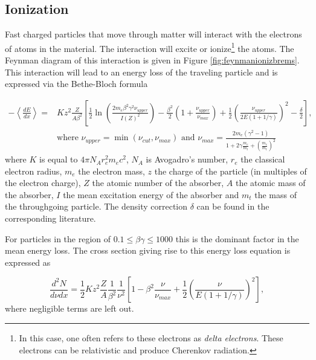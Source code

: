 \subsection{Ionization}
Fast charged particles that move through matter will interact with the electrons of atoms in the material. The interaction will excite or ionize\footnote{In this case, one often refers to these electrons as \textit{delta electrons}. These electrons can be relativistic and produce Cherenkov radiation.} the atoms. The Feynman diagram of this interaction is given in Figure \ref{fig:feynmanionizbrems}. This interaction will lead to an energy loss of the traveling particle and is expressed via the Bethe-Bloch formula

\begin{equation}
\label{eq:ioniz}
\begin{split}
-\left\langle\frac{dE}{dx}\right\rangle = &K z^2 \frac{Z}{A \beta^2} \left[\frac{1}{2} \ln \left(\frac{2 m_e \beta^2 \gamma^2 \nu_{upper}}{I\left(Z\right)^2} \right) -\frac{\beta^2}{2}  \left(1+\frac{\nu_{upper}}{\nu_{max}} \right) + \frac{1}{2} \left( \frac{\nu_{upper}}{2E(1+1/\gamma)}\right)^2 - \frac{\delta}{2}\right], \\ 
&\textrm{where } \nu_{upper} = \min(\nu_{cut},\nu_{max}) \textrm{ \ \ and \ \ } \nu_{max} = \frac{2 m_e (\gamma^2 -1)}{1+2\gamma \frac{m_e}{m_t} +\left(\frac{m_e}{m_t}\right)^2}
\end{split}
\end{equation} 
where $K$ is equal to $4\pi N_A r_e^2 m_e c^2$, $N_A$ is Avogadro's number, $r_e$ the classical electron radius, $m_e$ the electron mass, $z$ the charge of the particle (in multiples of the electron charge), $Z$ the atomic number of the absorber, $A$ the atomic mass of the absorber, $I$ the mean excitation energy of the absorber and $m_t$ the mass of the throughgoing particle. The density correction $\delta$ can be found in the corresponding literature.

For particles in the region of $0.1 \leq \beta \gamma \leq 1000$ this is the dominant factor in the mean energy loss. The cross section giving rise to this energy loss equation is expressed as

\begin{equation}
\frac{d^2N}{d\nu dx} = \frac{1}{2} K z^2 \frac{Z}{A} \frac{1}{\beta^2} \frac{1}{
\nu^2} \left[1-\beta^2 \frac{\nu}{\nu_{max}} + \frac{1}{2} \left(\frac{\nu}{E(1+1/\gamma)} \right)^2 \right],
\end{equation}
where negligible terms are left out.


